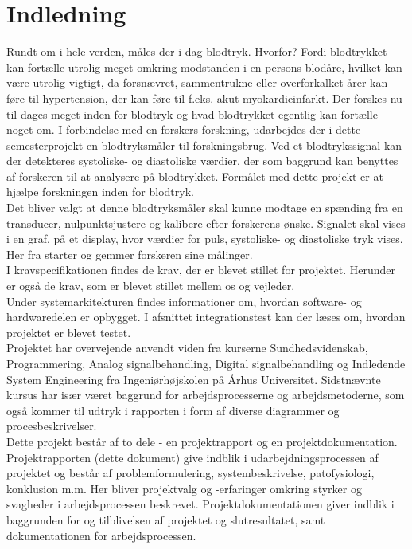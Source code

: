 
\chapter{Indledning}
Rundt om i hele verden, måles der i dag blodtryk. Hvorfor? Fordi blodtrykket kan fortælle utrolig meget omkring modstanden i en persons blodåre, hvilket kan være utrolig vigtigt, da forsnævret, sammentrukne eller overforkalket årer kan føre til hypertension, der kan føre til f.eks. akut myokardieinfarkt. Der forskes nu til dages meget inden for blodtryk og hvad blodtrykket egentlig kan fortælle noget om. I forbindelse med en forskers forskning, udarbejdes der i dette semesterprojekt en blodtryksmåler til forskningsbrug. Ved et blodtrykssignal kan der detekteres systoliske- og diastoliske værdier, der som baggrund kan benyttes af forskeren til at analysere på blodtrykket. Formålet med dette projekt er at hjælpe forskningen inden for blodtryk. \\
Det bliver valgt at denne blodtryksmåler skal kunne modtage en spænding fra en transducer, nulpunktsjustere og kalibere efter forskerens ønske. Signalet skal vises i en graf, på et display, hvor værdier for puls, systoliske- og diastoliske tryk vises. Her fra starter og gemmer forskeren sine målinger. \\
I kravspecifikationen findes de krav, der er blevet stillet for projektet. Herunder er også de krav, som er blevet stillet mellem os og vejleder. \\
Under systemarkitekturen findes informationer om, hvordan software- og hardwaredelen er opbygget.  I afsnittet integrationstest kan der læses om, hvordan projektet er blevet testet. \\
Projektet har overvejende anvendt viden fra kurserne Sundhedsvidenskab, Programmering, Analog signalbehandling, Digital signalbehandling og Indledende System Engineering fra Ingeniørhøjskolen på Århus Universitet. Sidstnævnte kursus har især været baggrund for arbejdsprocesserne og arbejdsmetoderne, som også kommer til udtryk i rapporten i form af diverse diagrammer og procesbeskrivelser. \\
Dette projekt består af to dele - en projektrapport og en projektdokumentation. Projektrapporten (dette dokument) give indblik i udarbejdningsprocessen af projektet og består af problemformulering, systembeskrivelse, patofysiologi, konklusion m.m. Her bliver projektvalg og -erfaringer omkring styrker og svagheder i arbejdsprocessen beskrevet. Projektdokumentationen giver indblik i baggrunden for og tilblivelsen af projektet og slutresultatet, samt dokumentationen for arbejdsprocessen. \\


